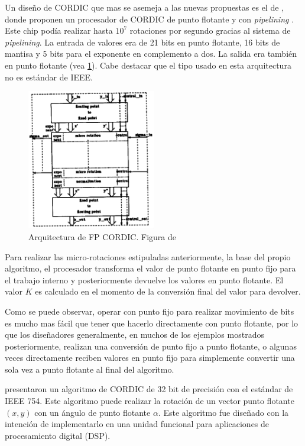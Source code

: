 Un diseño de CORDIC que mas se asemeja a las nuevas propuestas es el de \cite{de_lange_optimal_1988}, donde proponen un procesador de CORDIC de punto flotante y con \textit{pipelining} . Este chip podía realizar hasta $10^7$ rotaciones por segundo gracias al sistema de \textit{pipelining}. La entrada de valores era de 21 bits en punto flotante, 16 bits de mantisa y 5 bits para el exponente en complemento a dos. La salida era también en punto flotante (vea \ref{graf:Arq_FP_CORDIC}). Cabe destacar que el tipo usado en esta arquitectura no es estándar de IEEE.

\begin{figure}[ht]
	\centering
	\includegraphics[width=0.5\textwidth]{archivos/CORDIC/1988_FP_CORDIC_Architecture.png}
	\caption{Arquitectura de FP CORDIC. Figura de \cite{de_lange_optimal_1988}}
	\label{graf:Arq_FP_CORDIC}
\end{figure}

Para realizar las micro-rotaciones estipuladas anteriormente, la base del propio algoritmo, el procesador transforma el valor de punto flotante en punto fijo para el trabajo interno y posteriormente devuelve los valores en punto flotante. El valor $K$ es calculado en el momento de la conversión final del valor para devolver.

Como se puede observar, operar con punto fijo para realizar movimiento de bits es mucho mas fácil que tener que hacerlo directamente con punto flotante, por lo que los diseñadores generalmente, en muchos de los ejemplos mostrados posteriormente, realizan una conversión de punto fijo a punto flotante, o algunas veces directamente reciben valores en punto fijo para simplemente convertir una sola vez a punto flotante al final del algoritmo.

\cite{hekstra_floating_1993} presentaron un algoritmo de CORDIC de 32 bit de precisión con el estándar de IEEE 754. Este algoritmo puede realizar la rotación de un vector punto flotante $(x,y)$ con un ángulo de punto flotante $\alpha$. Este algoritmo fue diseñado con la intención de implementarlo en una unidad funcional para aplicaciones de procesamiento digital (DSP).


